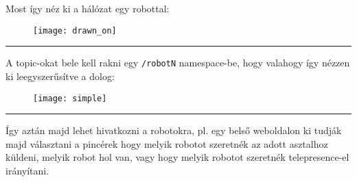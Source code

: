 \documentclass[a4paper, 10pt]{article}
\begin{document}
\pagestyle{empty}
\def\a{5mm}

Most így néz ki a hálózat egy robottal:
\begin{figure}[H]
 \centering
 {\texttt{[image: drawn\_on]}}
\end{figure}
\vspace{\a}
\hrule
\vspace{\a}
A topic-okat bele kell rakni egy \verb|/robotN| namespace-be, hogy valahogy így nézzen ki leegyszerűsítve a dolog:
\begin{figure}[H]
 \centering
 {\texttt{[image: simple]}}
\end{figure}
\vspace{\a}
\hrule
\vspace{\a}
Így aztán majd lehet hivatkozni a robotokra, pl. egy belső weboldalon ki tudják majd választani a pincérek hogy melyik robotot szeretnék az adott asztalhoz küldeni, melyik robot hol van, vagy hogy melyik robotot szeretnék telepresence-el irányítani.
\end{document}
